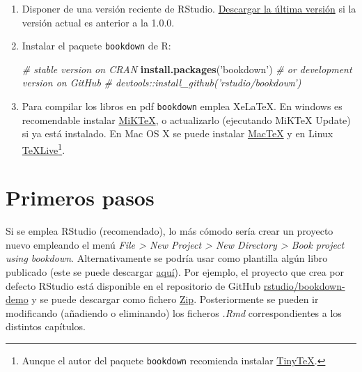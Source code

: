 \documentclass[]{book}
\newenvironment{Shaded}{\begin{snugshade}}{\end{snugshade}}
\newcommand{\KeywordTok}[1]{\textcolor[rgb]{0.13,0.29,0.53}{\textbf{#1}}}
\newcommand{\StringTok}[1]{\textcolor[rgb]{0.31,0.60,0.02}{#1}}
\newcommand{\CommentTok}[1]{\textcolor[rgb]{0.56,0.35,0.01}{\textit{#1}}}
\newcommand{\NormalTok}[1]{#1}
\let\rmarkdownfootnote\footnote%
\def\footnote{\protect\rmarkdownfootnote}
\theoremstyle{definition}
\theoremstyle{definition}
\theoremstyle{definition}
\theoremstyle{remark}
\begin{document}
\begin{enumerate}
\def\labelenumi{\arabic{enumi}.}
\item
  Disponer de una versión reciente de RStudio.
  \href{https://www.rstudio.com/products/rstudio/download/}{Descargar la
  última versión} si la versión actual es anterior a la 1.0.0.
\item
  Instalar el paquete \texttt{bookdown} de R:

\begin{Shaded}
\begin{Highlighting}[]
\CommentTok{# stable version on CRAN}
\KeywordTok{install.packages}\NormalTok{(}\StringTok{'bookdown'}\NormalTok{)}
\CommentTok{# or development version on GitHub}
\CommentTok{# devtools::install_github('rstudio/bookdown')}
\end{Highlighting}
\end{Shaded}
\item
  Para compilar los libros en pdf \texttt{bookdown} emplea XeLaTeX. En
  windows es recomendable instalar
  \href{https://miktex.org/download}{MiKTeX}, o actualizarlo (ejecutando
  MiKTeX Update) si ya está instalado. En Mac OS X se puede instalar
  \href{http://www.tug.org/mactex/}{MacTeX} y en Linux
  \href{http://www.tug.org/texlive}{TeXLive}\footnote{Aunque el autor
    del paquete \texttt{bookdown} recomienda instalar
    \href{https://yihui.name/tinytex}{TinyTeX}.}.
\end{enumerate}

\section{Primeros pasos}\label{primeros-pasos}

Si se emplea RStudio (recomendado), lo más cómodo sería crear un
proyecto nuevo empleando el menú \emph{File \textgreater{} New Project
\textgreater{} New Directory \textgreater{} Book project using
bookdown}. Alternativamente se podría usar como plantilla algún libro
publicado (este se puede descargar
\href{https://github.com/rubenfcasal/bookdown_intro/archive/master.zip}{aquí}).
Por ejemplo, el proyecto que crea por defecto RStudio está disponible en
el repositorio de GitHub
\href{https://github.com/rstudio/bookdown-demo}{rstudio/bookdown-demo} y
se puede descargar como fichero
\href{https://github.com/rstudio/bookdown-demo/archive/master.zip}{Zip}.
Posteriormente se pueden ir modificando (añadiendo o eliminando) los
ficheros \emph{.Rmd} correspondientes a los distintos capítulos.
\end{document}
